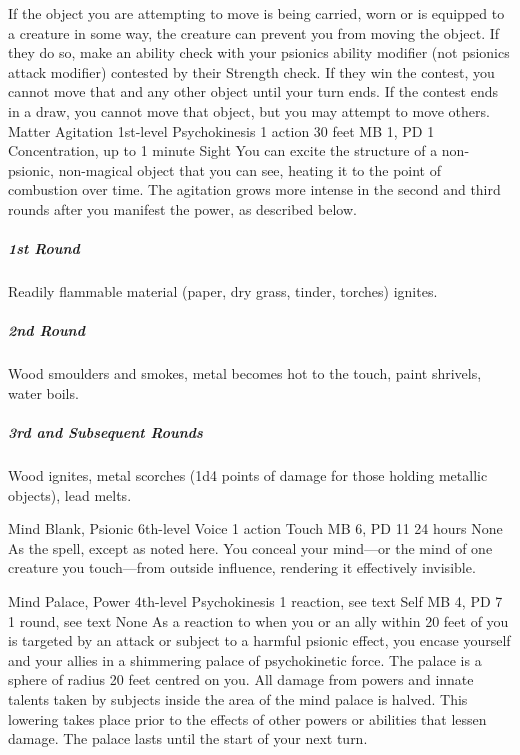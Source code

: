 If the object you are attempting to move is being carried,
worn or is equipped to a creature in some way, the creature
can prevent you from moving the object. If they do so, make
an ability check with your psionics ability modifier (not
psionics attack modifier) contested by their Strength check.
If they win the contest, you cannot move that and any other
object until your turn ends. If the contest ends in a draw,
you cannot move that object, but you may attempt to move others.
\DndPowerHeader%
    {Matter Agitation\label{pwr:matter-agitation}}
    {1st-level Psychokinesis}
    {1 action}
    {30 feet}
    {MB 1, PD 1}
    {Concentration, up to 1 minute}
    {Sight}
You can excite the structure of a non-psionic,
non-magical object that you can see,
heating it to the point of combustion over time.
The agitation grows more intense in the second and third rounds
after you manifest the power, as described below.

\subparagraph{1st Round}
  Readily flammable material
  (paper, dry grass, tinder, torches) ignites.

\subparagraph{2nd Round}
  Wood smoulders and smokes,
  metal becomes hot to the touch,
  paint shrivels, water boils.

\subparagraph{3rd and Subsequent Rounds}
  Wood ignites, metal scorches
  (1d4 points of damage for those holding metallic objects),
  lead melts.

\DndPowerHeader%
    {Mind Blank, Psionic\label{pwr:mind-blank-psionic}}
    {6th-level Voice}
    {1 action}
    {Touch}
    {MB 6, PD 11}
    {24 hours}
    {None}
As the  spell, except as
noted here. You conceal your mind---or the mind of one creature
you touch---from outside influence, rendering it effectively
invisible.

\DndPowerHeader%
    {Mind Palace, Power\label{pwr:mind-palace-power}}
    {4th-level Psychokinesis}
    {1 reaction, see text}
    {Self}
    {MB 4, PD 7}
    {1 round, see text}
    {None}
As a reaction to when you or an ally within
20 feet of you is targeted by an attack or subject to a harmful
psionic effect, you encase yourself and your allies in a shimmering
palace of psychokinetic force. The palace is a sphere of radius
20 feet centred on you. All damage from powers and innate
talents taken by subjects inside the area of the mind palace
is halved. This lowering takes place prior to the effects
of other powers or abilities that lessen damage. The palace
lasts until the start of your next turn.

